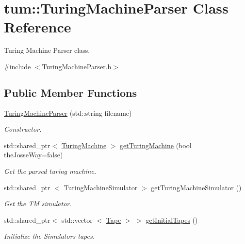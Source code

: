 \hypertarget{classtum_1_1_turing_machine_parser}{\section{tum\-:\-:\-Turing\-Machine\-Parser \-Class \-Reference}
\label{classtum_1_1_turing_machine_parser}
}


\-Turing \-Machine \-Parser class.  




{\ttfamily \#include $<$\-Turing\-Machine\-Parser.\-h$>$}

\subsection*{\-Public \-Member \-Functions}
\begin{DoxyCompactItemize}
\item 
\hyperlink{classtum_1_1_turing_machine_parser_a67e81dfd10267100598e0a2e6b09b699}{\-Turing\-Machine\-Parser} (std\-::string filename)
\begin{DoxyCompactList}\small\item\em \-Constructor. \end{DoxyCompactList}\item 
std\-::shared\-\_\-ptr$<$ \hyperlink{classtum_1_1_turing_machine}{\-Turing\-Machine} $>$ \hyperlink{classtum_1_1_turing_machine_parser_a24f81e21d1a867d9103bdf2ecfc647f4}{get\-Turing\-Machine} (bool the\-Josse\-Way=false)
\begin{DoxyCompactList}\small\item\em \-Get the parsed turing machine. \end{DoxyCompactList}\item 
std\-::shared\-\_\-ptr\*
$<$ \hyperlink{classtum_1_1_turing_machine_simulator}{\-Turing\-Machine\-Simulator} $>$ \hyperlink{classtum_1_1_turing_machine_parser_adad8c53941133cc8d70a7ad8d1f7a785}{get\-Turing\-Machine\-Simulator} ()
\begin{DoxyCompactList}\small\item\em \-Get the \-T\-M simulator. \end{DoxyCompactList}\item 
std\-::shared\-\_\-ptr$<$ std\-::vector\*
$<$ \hyperlink{classtum_1_1_tape}{\-Tape} $>$ $>$ \hyperlink{classtum_1_1_turing_machine_parser_abf0771a214c5a98c81d5bd5633ecc9bc}{get\-Initial\-Tapes} ()
\begin{DoxyCompactList}\small\item\em \-Initialize the \-Simulators tapes. \end{DoxyCompactList}\end{DoxyCompactItemize}



